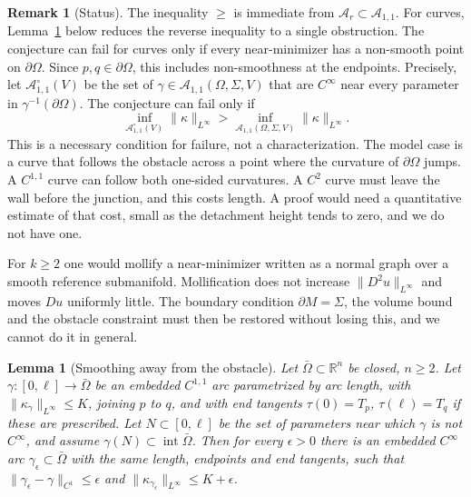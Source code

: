 \documentclass[11pt,reqno]{amsart}
\newtheorem{lemma}[theorem]{Lemma}
\theoremstyle{definition}
\newtheorem{remark}[theorem]{Remark}
\providecommand{\R}{\mathbb{R}}
\numberwithin{equation}{section}
\providecommand{\R}{\mathbb{R}}
\begin{document}
\begin{remark}[Status]
\label{rem:regularity_status}
The inequality $\ge$ is immediate from $\mathcal{A}_r \subset \mathcal{A}_{1,1}$. For curves, Lemma~\ref{lem:smoothing_interior} below reduces the reverse inequality to a single obstruction. The conjecture can fail for curves only if every near-minimizer has a non-smooth point on $\partial\Omega$. Since $p, q \in \partial\Omega$, this includes non-smoothness at the endpoints. Precisely, let $\mathcal{A}^{\circ}_{1,1}(V)$ be the set of $\gamma \in \mathcal{A}_{1,1}(\Omega, \Sigma, V)$ that are $C^\infty$ near every parameter in $\gamma^{-1}(\partial\Omega)$. The conjecture can fail only if
\[
\inf_{\mathcal{A}^{\circ}_{1,1}(V)} \|\kappa\|_{L^\infty} > \inf_{\mathcal{A}_{1,1}(\Omega, \Sigma, V)} \|\kappa\|_{L^\infty}.
\]
This is a necessary condition for failure, not a characterization. The model case is a curve that follows the obstacle across a point where the curvature of $\partial\Omega$ jumps. A $C^{1,1}$ curve can follow both one-sided curvatures. A $C^2$ curve must leave the wall before the junction, and this costs length. A proof would need a quantitative estimate of that cost, small as the detachment height tends to zero, and we do not have one.

For $k \ge 2$ one would mollify a near-minimizer written as a normal graph over a smooth reference submanifold. Mollification does not increase $\|D^2 u\|_{L^\infty}$ and moves $Du$ uniformly little. The boundary condition $\partial M = \Sigma$, the volume bound and the obstacle constraint must then be restored without losing this, and we cannot do it in general.
\end{remark}

\begin{lemma}[Smoothing away from the obstacle]
\label{lem:smoothing_interior}
Let $\bar\Omega \subset \R^n$ be closed, $n \ge 2$. Let $\gamma\colon [0,\ell] \to \bar\Omega$ be an embedded $C^{1,1}$ arc parametrized by arc length, with $\|\kappa_\gamma\|_{L^\infty} \le K$, joining $p$ to $q$, and with end tangents $\tau(0) = T_p$, $\tau(\ell) = T_q$ if these are prescribed. Let $N \subset [0,\ell]$ be the set of parameters near which $\gamma$ is not $C^\infty$, and assume $\gamma(N) \subset \operatorname{int}\bar\Omega$. Then for every $\epsilon > 0$ there is an embedded $C^\infty$ arc $\gamma_\epsilon \subset \bar\Omega$ with the same length, endpoints and end tangents, such that $\|\gamma_\epsilon - \gamma\|_{C^1} \le \epsilon$ and $\|\kappa_{\gamma_\epsilon}\|_{L^\infty} \le K + \epsilon$.
\end{lemma}
\end{document}
